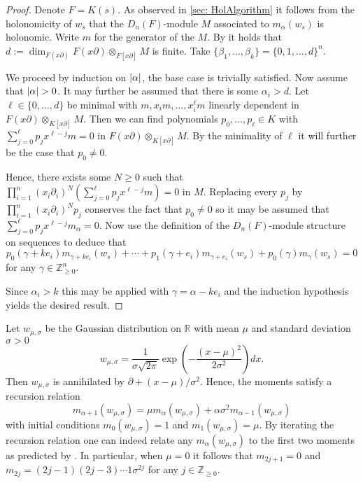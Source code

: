 \begin{proof}
  Denote $F = K(s).$
  As observed in \cref{sec: HolAlgorithm} it follows from the holonomicity of $w_s$ that the $D_n(F)$-module $M$ associated to $m_{\alpha}(w_s)$ is holonomic.
  Write $m$ for the generator of the $M$.
  By  it holds that $d:=\dim_{F(x\partial)}F(x\partial)\otimes_{F[x\partial]}M$ is finite.
  Take $\{\beta_1,\ldots,\beta_k\} = \{0,1,\ldots,d\}^n$.

  We proceed by induction on $\vert \alpha \vert$, the base case is trivially satisfied.
  Now assume that $\vert \alpha \vert>0$.
  It may further be assumed that there is some $\alpha_i>d$.
  Let $\ell \in \{0,\ldots,d\}$ be minimal with $m, x_im,\ldots,x_i^{\ell}m$ linearly dependent in $F(x\partial)\otimes_{K[x\partial]}M$.
  Then we can find polynomials $p_0,\ldots, p_\ell\in K$ with $\sum_{j=0}^\ell p_j x^{\ell - j} m =0$ in $F(x\partial)\otimes_{K[x\partial]}M$.
  By the minimality of $\ell$ it will further be the case that $p_0\neq 0$.

  Hence, there exists some $N\geq 0$ such that $\prod_{i=1}^n (x_i\partial_i)^N(\sum_{j=0}^\ell p_j x^{\ell - j} m) = 0$ in $M$.
  Replacing every $p_j$ by $\prod_{i=1}^n(x_i\partial_i)^Np_j$ conserves the fact that $p_0\neq 0$ so it may be assumed that $\sum_{j=0}^\ell p_j x^{\ell - j} m_{\alpha} =0$.
  Now use the definition of the $D_n(F)$-module structure on sequences to deduce that
  $$ p_0(\gamma + ke_i)  m_{\gamma +ke_i}(w_s) + \cdots + p_1(\gamma +e_i)m_{\gamma + e_i}(w_s) + p_0(\gamma)m_{\gamma}(w_s) =0$$
  for any $\gamma \in \mathbb{Z}_{\geq 0}^n$.

  Since $\alpha_i >k$ this may be applied with $\gamma = \alpha - ke_i$ and the induction hypothesis yields the desired result.
\end{proof}
\begin{example}\label{ex: GaussianMono}
  Let $w_{\mu,\sigma}$ be the Gaussian distribution on $\mathbb{R}$ with mean $\mu$ and standard deviation $\sigma>0$
  $$w_{\mu,\sigma} =\frac{1}{\sigma \sqrt{2\pi}} \exp\left(-\frac{(x-\mu)^2}{2\sigma^2}\right)dx.$$
  Then $w_{\mu,\sigma}$ is annihilated by $\partial +(x-\mu)/\sigma^2$. Hence, the moments satisfy a recursion relation
  $$m_{\alpha + 1}(w_{\mu,\sigma}) = \mu m_{\alpha}(w_{\mu,\sigma}) + \alpha \sigma^2 m_{\alpha-1}(w_{\mu,\sigma})$$
  with initial conditions $m_{0}(w_{\mu,\sigma}) =1$ and $ m_1(w_{\mu,\sigma}) = \mu.$
  By iterating the recursion relation one can indeed relate any $m_\alpha(w_{\mu,\sigma})$ to the first two moments as predicted by .
  In particular, when $\mu = 0$ it follows that $m_{2j + 1}= 0$ and $m_{2j} = (2j - 1)(2j - 3)\cdots 1 \sigma^{2j}$ for any $j\in \mathbb{Z}_{\geq 0}$.
\end{example}
